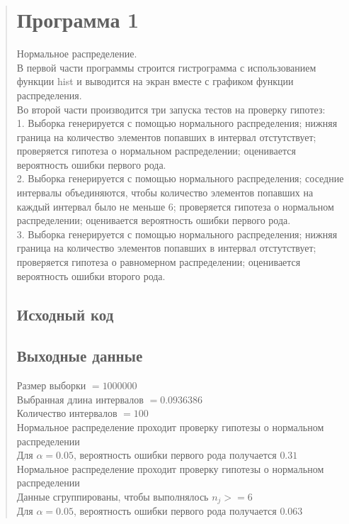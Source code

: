 \documentclass{article}
\begin{document}
\begin{quote}
\section{Программа 1}
	Нормальное распределение. \\
	В первой части программы строится гистрограмма с использованием функции hist и выводится на экран вместе с графиком функции распределения. \\
	Во второй части производится три запуска тестов на проверку гипотез: \\
	1. Выборка генерируется с помощью нормального распределения; нижняя граница на количество элементов попавших в интервал отстутствует; проверяется гипотеза о нормальном распределении; оценивается вероятность ошибки первого рода. \\
	2. Выборка генерируется с помощью нормального распределения; соседние интервалы объединяются, чтобы количество элементов попавших на каждый интервал было не меньше 6; проверяется гипотеза о нормальном распределении; оценивается вероятность ошибки первого рода. \\
	3. Выборка генерируется с помощью нормального распределения; нижняя граница на количество элементов попавших в интервал отстутствует; проверяется гипотеза о равномерном распределении; оценивается вероятность ошибки второго рода. \\
\subsection{Исходный код}
	
\subsection{Выходные данные}
	Размер выборки $= 1000000$ \\
	Выбранная длина интервалов $= 0.0936386$ \\
	Количество интервалов $= 100$ \\

	Нормальное распределение проходит проверку гипотезы о нормальном распределении \\
	Для $\alpha = 0.05$, вероятность ошибки первого рода получается $0.31$ \\

	Нормальное распределение проходит проверку гипотезы о нормальном распределении \\
	Данные сгруппированы, чтобы выполнялось $n_j >= 6$ \\
	Для $\alpha = 0.05$, вероятность ошибки первого рода получается $0.063$ \\


\end{quote}
\end{document}
